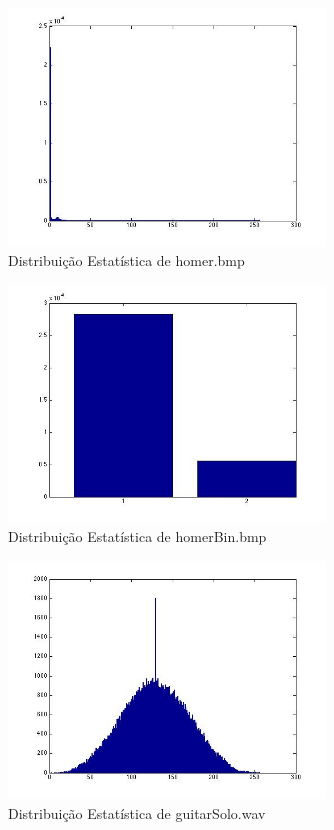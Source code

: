 \documentclass{article}
\begin{document}
  \begin{figure}[H]
    \centering
      \includegraphics[width=0.75\textwidth]{ex3homer}
    \caption{Distribuição Estatística de homer.bmp}
  \end{figure}

  \begin{figure}[H]
    \centering
      \includegraphics[width=0.75\textwidth]{ex3homerbin}
    \caption{Distribuição Estatística de homerBin.bmp}
  \end{figure}

  \begin{figure}[H]
    \centering
      \includegraphics[width=0.75\textwidth]{ex3guitarsolo}
    \caption{Distribuição Estatística de guitarSolo.wav}
  \end{figure}
\end{document}
